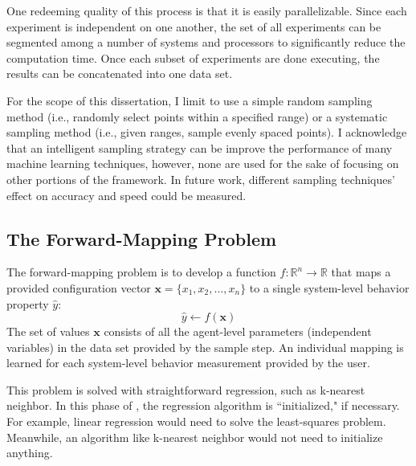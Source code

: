 One redeeming quality of this process is that it is easily parallelizable.
Since each experiment is independent on one another, the set of all experiments can be segmented among a number of systems and processors to significantly reduce the computation time.
Once each subset of experiments are done executing, the results can be concatenated into one data set.

For the scope of this dissertation, I limit \fw to use a simple random sampling method (i.e., randomly select points within a specified range) or a systematic sampling method (i.e., given ranges, sample evenly spaced points).
I acknowledge that an intelligent sampling strategy can be improve the performance of many machine learning techniques, however, none are used for the sake of focusing on other portions of the framework.
In future work, different sampling techniques' effect on accuracy and speed could be measured.



\subsection{The Forward-Mapping Problem}


The forward-mapping problem is to develop a function $f: \mathbb{R}^n \rightarrow \mathbb{R}$ that maps a provided configuration vector $\mathbf x = \{x_1, x_2, ..., x_n \}$ to a single system-level behavior property $\hat y$:
\[\hat y \leftarrow f(\mathbf x)\]
The set of values $\mathbf x$ consists of all the agent-level parameters (independent variables) in the data set provided by the sample step.
An individual mapping is learned for each system-level behavior measurement provided by the user.

This problem is solved with straightforward regression, such as k-nearest neighbor.
In this phase of \fw, the regression algorithm is ``initialized," if necessary.
For example, linear regression would need to solve the least-squares problem.
Meanwhile, an algorithm like k-nearest neighbor would not need to initialize anything.

